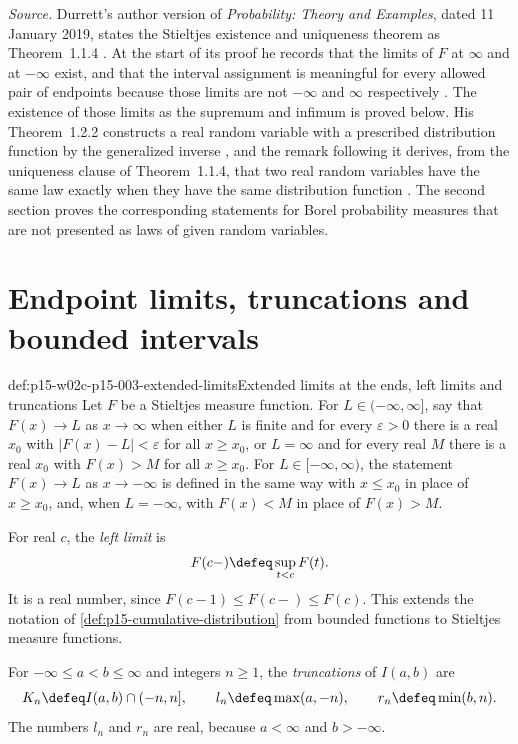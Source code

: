 \emph{Source.} Durrett's author version of \emph{Probability: Theory and
Examples}, dated 11 January 2019, states the Stieltjes existence and
uniqueness theorem as Theorem~1.1.4 \cite[thm.~1.1.4, p.~3]{DurrettPTEAuthor2019}.
At the start of its proof he records that the limits of \(F\) at
\(\infty\) and at \(-\infty\) exist, and that the interval assignment
is meaningful for every allowed pair of endpoints because those limits are
not \(-\infty\) and \(\infty\) respectively
\cite[p.~5]{DurrettPTEAuthor2019}. The existence of those limits as the
supremum and infimum is proved below. His Theorem~1.2.2 constructs a real
random variable with a prescribed distribution function by the generalized
inverse \cite[thm.~1.2.2, p.~11]{DurrettPTEAuthor2019}, and the remark
following it derives, from the uniqueness clause of Theorem~1.1.4, that two
real random variables have the same law exactly when they have the same
distribution function \cite[pp.~11--12]{DurrettPTEAuthor2019}. The second
section proves the corresponding statements for Borel probability measures
that are not presented as laws of given random variables.

\section{Endpoint limits, truncations and bounded intervals}
\label{sec:p15-w02c-p15-003-endpoint-limits}

\begin{hbdefinition}{def:p15-w02c-p15-003-extended-limits}{Extended limits at the ends, left limits and truncations}
Let \(F\) be a Stieltjes measure function. For
\(L\in(-\infty,\infty]\), say that \(F(x)\to L\) as \(x\to\infty\)
when either \(L\) is finite and for every \(\varepsilon>0\) there is a
real \(x_0\) with \(|F(x)-L|<\varepsilon\) for all \(x\geq x_0\), or
\(L=\infty\) and for every real \(M\) there is a real \(x_0\) with
\(F(x)>M\) for all \(x\geq x_0\). For \(L\in[-\infty,\infty)\),
the statement \(F(x)\to L\) as \(x\to-\infty\) is defined in the same
way with \(x\leq x_0\) in place of \(x\geq x_0\), and, when
\(L=-\infty\), with \(F(x)<M\) in place of \(F(x)>M\).

For real \(c\), the \emph{left limit} is
\[
 F(c-)\defeq\sup_{t<c}F(t).
\]
It is a real number, since \(F(c-1)\leq F(c-)\leq F(c)\). This extends
the notation of \cref{def:p15-cumulative-distribution} from bounded
functions to Stieltjes measure functions.

For \(-\infty\leq a<b\leq\infty\) and integers \(n\geq1\), the
\emph{truncations} of \(I(a,b)\) are
\[
 K_n\defeq I(a,b)\cap(-n,n],\qquad
 l_n\defeq\max(a,-n),\qquad r_n\defeq\min(b,n).
\]
The numbers \(l_n\) and \(r_n\) are real, because \(a<\infty\) and
\(b>-\infty\).
\end{hbdefinition}

